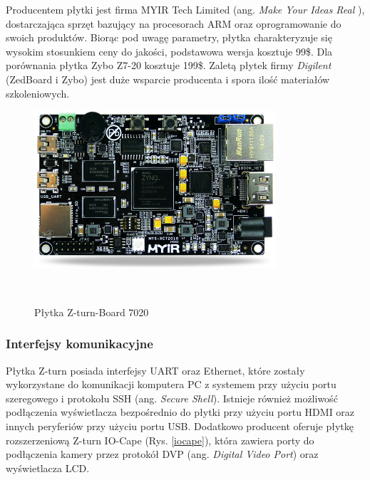 Producentem płytki jest firma MYIR Tech Limited (ang. \emph{Make Your Ideas Real} ), dostarczająca sprzęt bazujący na 
procesorach ARM oraz oprogramowanie do swoich produktów\cite{myir}. Biorąc pod uwagę parametry, płytka charakteryzuje się 
wysokim stosunkiem ceny do jakości, podstawowa wersja kosztuje 99\$. Dla porównania płytka Zybo Z7-20 kosztuje 199\$. Zaletą 
płytek firmy \emph{Digilent} (ZedBoard i Zybo) jest duże wsparcie producenta i spora ilość materiałów szkoleniowych.

\begin{figure}[h]
  \centering
  \includegraphics[width=0.8\textwidth]{img/zturn_board.jpg}
  \caption{Płytka Z-turn-Board 7020 \cite{zturn-obraz}}
 \
\end{figure}


\subsubsection{Interfejsy komunikacyjne}

Płytka Z-turn posiada interfejsy UART oraz Ethernet, które zostały wykorzystane do komunikacji komputera PC z systemem przy 
użyciu portu szeregowego  
i protokołu SSH (ang. \emph{Secure Shell}). Istnieje również możliwość podłączenia wyświetlacza bezpośrednio do płytki przy 
użyciu portu HDMI oraz innych peryferiów przy użyciu portu USB. Dodatkowo producent oferuje płytkę rozszerzeniową Z-turn 
IO-Cape (Rys. \ref{iocape}), która zawiera porty do podłączenia kamery przez protokół DVP (ang. \emph{Digital Video Port}) 
oraz wyświetlacza LCD. 

